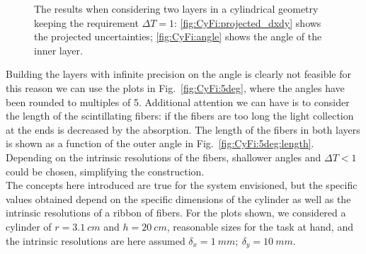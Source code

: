\begin{refsection}
\begin{figure}[ht]
            \hfill
            \caption[CHeT: resolution and angles for $\Delta T=1$]{The results when considering two layers in a cylindrical geometry keeping the requirement $\Delta T=1$: \ref{fig:CyFi:projected_dxdy} shows the projected uncertainties; \ref{fig:CyFi:angle} shows the angle of the inner layer.}
            \label{fig:CyFi}
        \end{figure}
        
        \noindent
        Building the layers with infinite precision on the angle is clearly not feasible for this reason we can use the plots in Fig.~\ref{fig:CyFi:5deg}, where the angles have been rounded to multiples of \SI{5}{\deg}. 
        Additional attention we can have is to consider the length of the scintillating fibers: if the fibers are too long the light collection at the ends is decreased by the absorption. The length of the fibers in both layers is shown as a function of the outer angle in Fig.~\ref{fig:CyFi:5deg:length}.
        Depending on the intrinsic resolutions of the fibers, shallower angles and $\Delta T<1$ could be chosen, simplifying the construction.\\
        
        \noindent
        The concepts here introduced are true for the system envisioned, but the specific values obtained depend on the specific dimensions of the cylinder as well as the intrinsic resolutions of a ribbon of fibers. 
        For the plots shown, we considered a cylinder of $r=\SI{3.1}{cm}$ and $h=\SI{20}{cm}$, reasonable sizes for the task at hand, and the intrinsic resolutions are here assumed $\delta_x = \SI{1}{mm};\ \delta_y = \SI{10}{mm}$.
        

\end{refsection}
